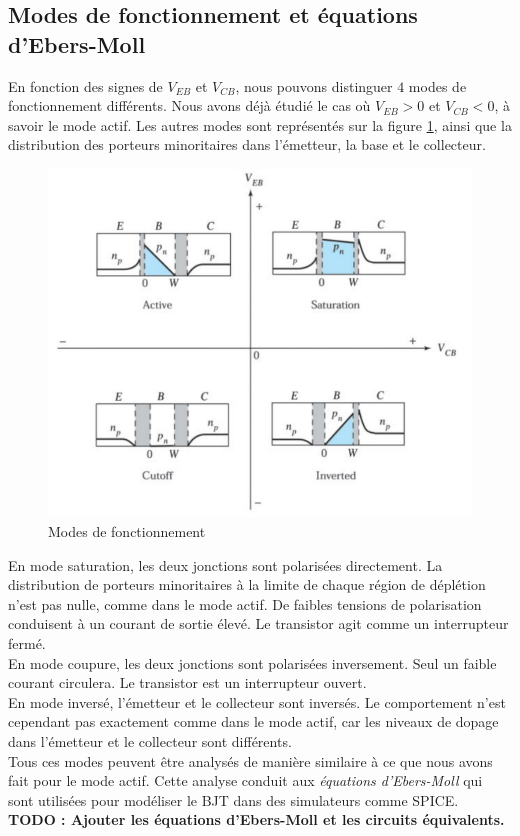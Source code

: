 \subsection{Modes de fonctionnement et équations d'Ebers-Moll}
\label{sec:modes_de_fonctionnement}
En fonction des signes de $V_{EB}$ et $V_{CB}$, nous pouvons distinguer $4$ modes de fonctionnement différents. Nous avons déjà étudié le cas où $V_{EB} > 0$ et $V_{CB} < 0$, à savoir le mode actif. Les autres modes sont représentés sur la figure \ref{fig:bjt_modes}, ainsi que la distribution des porteurs minoritaires dans l'émetteur, la base et le collecteur.
\begin{figure}[h!]
	\centering
	\includegraphics[width=12cm]{figures/ch01/bjt_modes.jpg}
	\caption{Modes de fonctionnement}
	\label{fig:bjt_modes}
\end{figure}
En mode saturation, les deux jonctions sont polarisées directement. La distribution de porteurs minoritaires à la limite de chaque région de déplétion n'est pas nulle, comme dans le mode actif. De faibles tensions de polarisation conduisent à un courant de sortie élevé. Le transistor agit comme un interrupteur fermé.\\
En mode coupure, les deux jonctions sont polarisées inversement. Seul un faible courant circulera. Le transistor est un interrupteur ouvert.\\
En mode inversé, l'émetteur et le collecteur sont inversés. Le comportement n'est cependant pas exactement comme dans le mode actif, car les niveaux de dopage dans l'émetteur et le collecteur sont différents.\\
Tous ces modes peuvent être analysés de manière similaire à ce que nous avons fait pour le mode actif. Cette analyse conduit aux \emph{équations d'Ebers-Moll} qui sont utilisées pour modéliser le BJT dans des simulateurs comme SPICE.\\
\textbf{TODO : Ajouter les équations d'Ebers-Moll et les circuits équivalents.}

